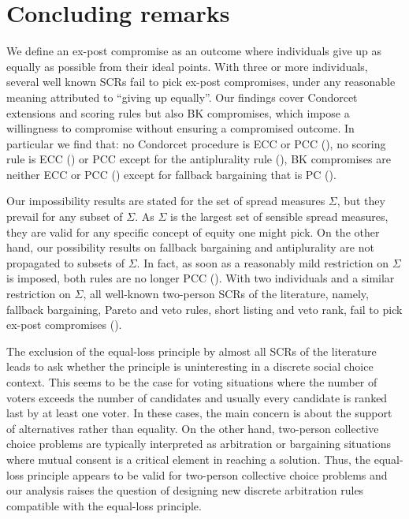 \section{Concluding remarks}
\label{sec:conclusion}
We define an ex-post compromise as an outcome where individuals give up as equally as possible from their ideal points. 
With three or more individuals, several well known \acp{SCR} fail to pick ex-post compromises, under any reasonable meaning attributed to “giving up equally”. 
Our findings cover Condorcet extensions and scoring rules but also \acs{BK} compromises, which impose a willingness to compromise without ensuring a compromised outcome.
In particular we find that: no Condorcet procedure is ECC or PCC (), no scoring rule is ECC () or PCC except for the antiplurality rule (), \acs{BK} compromises are neither ECC or PCC () except for fallback bargaining that is PC ().

Our impossibility results are stated for the set of spread measures $\Sigma$, but they prevail for any subset of $\Sigma$. As $\Sigma$ is the largest set of sensible spread measures, they are valid for any specific concept of equity one might pick. On the other hand, our possibility results on fallback bargaining and antiplurality are not propagated to subsets of $\Sigma$. In fact, as soon as a reasonably mild restriction on $\Sigma$ is imposed, both rules are no longer PCC (). With two individuals and a similar restriction on $\Sigma$, all well-known two-person SCRs of the literature, namely, fallback bargaining, Pareto and veto rules, short listing and veto rank, fail to pick ex-post compromises ().

The exclusion of the equal-loss principle by almost all \acp{SCR} of the literature leads to ask whether the principle is uninteresting in a discrete social choice context. This seems to be the case for voting situations where the number of voters exceeds the number of candidates and usually every candidate is ranked last by at least one voter. In these cases, the main concern is about the support of alternatives rather than equality. On the other hand, two-person collective choice problems are typically interpreted as arbitration or bargaining situations where mutual consent is a critical element in reaching a solution. Thus, the equal-loss principle appears to be valid for two-person collective choice problems and our analysis raises the question of designing new discrete arbitration rules compatible with the equal-loss principle. 

